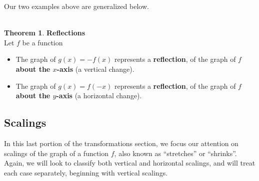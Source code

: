 \documentclass[11pt]{book}
\theoremstyle{definition}  %
\newtheorem{thm}{Theorem}[chapter] %
\newcommand{\bbm}{\begin{boxedminipage}{4.80in}} %
\newcommand{\ebm}{\end{boxedminipage}}
\begin{document}
Our two examples above are generalized below.\\
~\\
\bbm
\begin{thm} \label{reflections}\textbf{Reflections}\\
Let $f$ be a function
\begin{itemize}
\item The graph of $g(x)=-f(x)$ represents a \textbf{reflection}, of the graph of $f$ \textbf{about the $x$-axis} (a vertical change).
\item The graph of $g(x)=f(-x)$ represents a \textbf{reflection}, of the graph of $f$ \textbf{about the $y$-axis} (a horizontal change).
\end{itemize}
\end{thm}
\ebm

\smallskip

\newpage

\subsection{Scalings}

In this last portion of the transformations section, we focus our attention on scalings of the graph of a function $f$, also known as ``stretches'' or ``shrinks''.  Again, we will look to classify both vertical and horizontal scalings, and will treat each case separately, beginning with vertical scalings.
\end{document}
